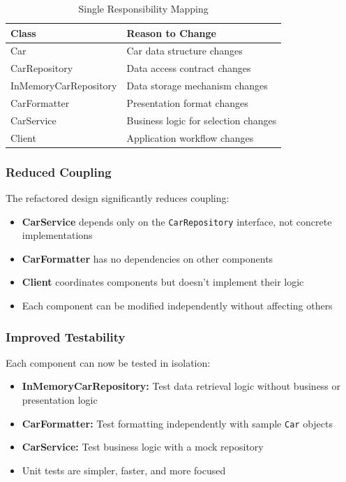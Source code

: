 \begin{table}[H]
\centering
\begin{tabular}{|l|p{8cm}|}
\hline
\textbf{Class} & \textbf{Reason to Change} \\
\hline
Car & Car data structure changes \\
\hline
CarRepository & Data access contract changes \\
\hline
InMemoryCarRepository & Data storage mechanism changes \\
\hline
CarFormatter & Presentation format changes \\
\hline
CarService & Business logic for selection changes \\
\hline
Client & Application workflow changes \\
\hline
\end{tabular}
\caption{Single Responsibility Mapping}
\label{tab:srp_responsibilities}
\end{table}

\subsubsection{Reduced Coupling}

The refactored design significantly reduces coupling:

\begin{itemize}
    \item \textbf{CarService} depends only on the \texttt{CarRepository} interface, not concrete implementations
    \item \textbf{CarFormatter} has no dependencies on other components
    \item \textbf{Client} coordinates components but doesn't implement their logic
    \item Each component can be modified independently without affecting others
\end{itemize}

\subsubsection{Improved Testability}

Each component can now be tested in isolation:

\begin{itemize}
    \item \textbf{InMemoryCarRepository:} Test data retrieval logic without business or presentation logic
    \item \textbf{CarFormatter:} Test formatting independently with sample \texttt{Car} objects
    \item \textbf{CarService:} Test business logic with a mock repository
    \item Unit tests are simpler, faster, and more focused
\end{itemize}

